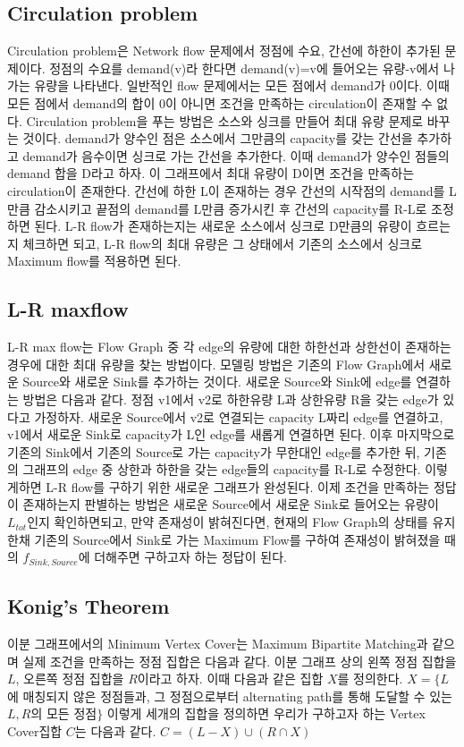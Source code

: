 \documentclass[10pt,landscape,a4paper,twocolumn]{article}
\begin{document}
\subsection{Circulation problem}
\hspace{1em}
Circulation problem은 Network flow 문제에서 정점에 수요, 간선에 하한이 추가된 문제이다.
정점의 수요를 demand(v)라 한다면 demand(v)=v에 들어오는 유량-v에서 나가는 유량을 나타낸다.
일반적인 flow 문제에서는 모든 점에서 demand가 0이다.
이때 모든 점에서 demand의 합이 0이 아니면 조건을 만족하는 circulation이 존재할 수 없다.
Circulation problem을 푸는 방법은 소스와 싱크를 만들어 최대 유량 문제로 바꾸는 것이다.
demand가 양수인 점은 소스에서 그만큼의 capacity를 갖는 간선을 추가하고 demand가 음수이면 싱크로 가는 간선을 추가한다.
이때 demand가 양수인 점들의 demand 합을 D라고 하자.
이 그래프에서 최대 유량이 D이면 조건을 만족하는 circulation이 존재한다.
간선에 하한 L이 존재하는 경우 간선의 시작점의 demand를 L만큼 감소시키고 끝점의 demand를 L만큼 증가시킨 후 간선의 capacity를 R-L로 조정하면 된다.
L-R flow가 존재하는지는 새로운 소스에서 싱크로 D만큼의 유량이 흐르는지 체크하면 되고, L-R flow의 최대 유량은 그 상태에서 기존의 소스에서 싱크로 Maximum flow를 적용하면 된다.

\subsection{L-R maxflow}
\hspace{1em}
L-R max flow는 Flow Graph 중 각 edge의 유량에 대한 하한선과 상한선이 존재하는 경우에 대한 최대 유량을 찾는 방법이다.
모델링 방법은 기존의 Flow Graph에서 새로운 Source와 새로운 Sink를 추가하는 것이다.
새로운 Source와 Sink에 edge를 연결하는 방법은 다음과 같다.
정점 v1에서 v2로 하한유량 L과 상한유량 R을 갖는 edge가 있다고 가정하자.
새로운 Source에서 v2로 연결되는 capacity L짜리 edge를 연결하고, v1에서 새로운 Sink로 capacity가 L인 edge를 새롭게 연결하면 된다.
이후 마지막으로 기존의 Sink에서 기존의 Source로 가는 capacity가 무한대인 edge를 추가한 뒤, 기존의 그래프의 edge 중 상한과 하한을 갖는 edge들의 capacity를 R-L로 수정한다.
이렇게하면 L-R flow를 구하기 위한 새로운 그래프가 완성된다.
이제 조건을 만족하는 정답이 존재하는지 판별하는 방법은 새로운 Source에서 새로운 Sink로 들어오는 유량이 $L_{tot}$인지 확인하면되고, 만약 존재성이 밝혀진다면, 현재의 Flow Graph의 상태를 유지한채 기존의 Source에서 Sink로 가는 Maximum Flow를 구하여 존재성이 밝혀졌을 때의 $f_{Sink,Source}$에 더해주면 구하고자 하는 정답이 된다.

\subsection{Konig's Theorem}
\hspace{1em}
이분 그래프에서의 Minimum Vertex Cover는 Maximum Bipartite Matching과 같으며 실제 조건을 만족하는 정점 집합은 다음과 같다.
이분 그래프 상의 왼쪽 정점 집합을 $L$, 오른쪽 정점 집합을 $R$이라고 하자.
이때 다음과 같은 집합 $X$를 정의한다.
$X=\{L$에 매칭되지 않은 정점들과, 그 정점으로부터 alternating path를 통해 도달할 수 있는 $L, R$의 모든 정점$\}$
이렇게 세개의 집합을 정의하면 우리가 구하고자 하는 Vertex Cover집합 $C$는 다음과 같다.
$C=(L-X)\cup{(R\cap{X})}$\\
\end{document}
